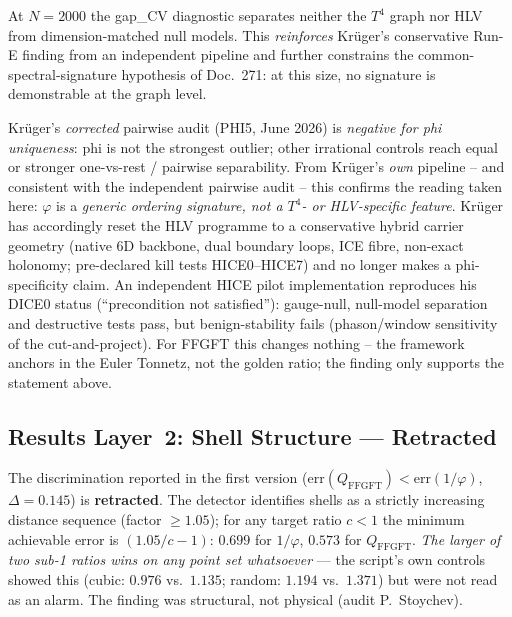 \begin{remark}
At $N=2000$ the gap\_CV diagnostic separates neither the $T^4$ graph
nor HLV from dimension-matched null models. This \emph{reinforces}
Krüger's conservative Run-E finding from an independent pipeline and
further constrains the common-spectral-signature hypothesis of
Doc.~271: at this size, no signature is demonstrable at the graph
level.
\end{remark}

\begin{remark}
Krüger's \emph{corrected} pairwise audit (PHI5, June 2026) is \emph{negative for phi
uniqueness}: phi is not the strongest outlier; other irrational controls reach equal or
stronger one-vs-rest / pairwise separability. From Krüger's \emph{own} pipeline -- and
consistent with the independent pairwise audit -- this confirms the reading taken here:
$\varphi$ is a \emph{generic ordering signature, not a $T^4$- or HLV-specific feature}.
Krüger has accordingly reset the HLV programme to a conservative hybrid carrier geometry
(native 6D backbone, dual boundary loops, ICE fibre, non-exact holonomy; pre-declared
kill tests HICE0--HICE7) and no longer makes a phi-specificity claim. An independent HICE
pilot implementation reproduces his DICE0 status (``precondition not satisfied''):
gauge-null, null-model separation and destructive tests pass, but benign-stability fails
(phason/window sensitivity of the cut-and-project). For FFGFT this changes nothing -- the
framework anchors in the Euler Tonnetz, not the golden ratio; the finding only supports
the statement above.
\end{remark}

\subsection{Results Layer~2: Shell Structure --- Retracted}\label{sec:layer2-275en}

\begin{remark}
The discrimination reported in the first version
($\mathrm{err}(Q_\mathrm{FFGFT}) < \mathrm{err}(1/\varphi)$,
$\Delta = 0.145$) is \textbf{retracted}. The detector identifies
shells as a strictly increasing distance sequence (factor
$\geq 1.05$); for any target ratio $c<1$ the minimum achievable error
is $(1.05/c - 1)$: $0.699$ for $1/\varphi$, $0.573$ for
$Q_\mathrm{FFGFT}$. \emph{The larger of two sub-1 ratios wins on any
point set whatsoever} --- the script's own controls showed this
(cubic: $0.976$ vs.\ $1.135$; random: $1.194$ vs.\ $1.371$) but were
not read as an alarm. The finding was structural, not physical
(audit P.~Stoychev).
\end{remark}


